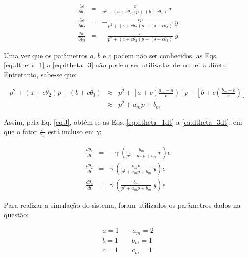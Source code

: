 \begin{eqnarray}
\frac{\partial \epsilon}{\partial \theta_1} & = &
    \frac{c}{p^2 + (a + c\theta_2)p + (b + c\theta_3)}\ r 
    \label{eq:dtheta_1}\\
\frac{\partial \epsilon}{\partial \theta_2} & = &
    -\frac{cp}{p^2 + (a + c\theta_2)p + (b + c\theta_3)}\ y 
    \label{eq:dtheta_2}\\
\frac{\partial \epsilon}{\partial \theta_3} & = &
    -\frac{c}{p^2 + (a + c\theta_2)p + (b + c\theta_3)}\ y 
    \label{eq:dtheta_3}
\end{eqnarray}

Uma vez que os parâmetros $a$, $b$ e $c$ podem não ser conhecidos, as Eqs.
\ref{eq:dtheta_1} a \ref{eq:dtheta_3} não podem ser utilizadas de maneira
direta. Entretanto, sabe-se que:

\begin{eqnarray}
p^2 + (a + c\theta_2)p + (b + c\theta_3) & \approx & 
p^2 + 
\left[a + c\left( \frac{a_m - a}{c} \right)\right]p + 
\left[b + c\left( \frac{b_m - b}{c} \right)\right] \nonumber\\ 
 & \approx & p^2 + a_mp + b_m \nonumber
\end{eqnarray}

Assim, pela Eq. \ref{eq:J}, obtém-se as Eqs. \ref{eq:dtheta_1dt} a
\ref{eq:dtheta_3dt}, em que o fator $\frac{c}{b_m}$ está incluso em $\gamma$:

\begin{eqnarray}
\frac{d\theta_1}{dt} & = & -\gamma\ \left(\frac{b_m}
                                             {p^2 + a_mp + b_m}\ r
                                  \right)\epsilon \label{eq:dtheta_1dt}\\
\frac{d\theta_2}{dt} & = & \gamma\ \left(\frac{b_m p}
                                            {p^2 + a_mp + b_m}\ y
                                 \right)\epsilon \label{eq:dtheta_2dt}\\
\frac{d\theta_3}{dt} & = & \gamma\ \left(\frac{b_m}
                                          {p^2 + a_mp + b_m}\ y
                               \right)\epsilon \label{eq:dtheta_3dt}
\end{eqnarray}

Para realizar a simulação do sistema, foram utilizados os parâmetros dados na
questão:

\begin{eqnarray}
a = 1 \qquad a_m = 2\\
b = 1 \qquad b_m = 1\\
c = 1 \qquad c_m = 1
\end{eqnarray}

